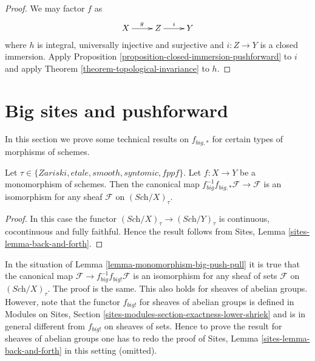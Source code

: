 \begin{proof}
We may factor $f$ as
$$
\xymatrix{
X \ar[r]^g & Z \ar[r]^i & Y
}
$$
where $h$ is integral, universally injective and surjective
and $i : Z \to Y$ is a closed immersion.
Apply
Proposition \ref{proposition-closed-immersion-pushforward}
to $i$ and apply
Theorem \ref{theorem-topological-invariance}
to $h$.
\end{proof}









\section{Big sites and pushforward}
\label{section-big}

\noindent
In this section we prove some technical results on $f_{big, *}$ for
certain types of morphisms of schemes.

\begin{lemma}
\label{lemma-monomorphism-big-push-pull}
Let $\tau \in \{Zariski, etale, smooth, syntomic, fppf\}$.
Let $f : X \to Y$ be a monomorphism of schemes.
Then the canonical map
$f_{big}^{-1}f_{big, *}\mathcal{F} \to \mathcal{F}$
is an isomorphism for any sheaf $\mathcal{F}$ on
$(\textit{Sch}/X)_\tau$.
\end{lemma}

\begin{proof}
In this case the functor $(\textit{Sch}/X)_\tau \to (\textit{Sch}/Y)_\tau$
is continuous, cocontinuous and fully faithful. Hence the result follows from
Sites, Lemma \ref{sites-lemma-back-and-forth}.
\end{proof}

\begin{remark}
\label{remark-push-pull-shriek}
In the situation of
Lemma \ref{lemma-monomorphism-big-push-pull}
it is true that the canonical map
$\mathcal{F} \to f_{big}^{-1}f_{big!}\mathcal{F}$
is an isomorphism for any sheaf of sets $\mathcal{F}$ on
$(\textit{Sch}/X)_\tau$. The proof is the same. This also
holds for sheaves of abelian groups. However, note
that the functor $f_{big!}$ for sheaves of abelian groups is defined in
Modules on Sites, Section \ref{sites-modules-section-exactness-lower-shriek}
and is in general different from $f_{big!}$ on sheaves of sets.
Hence to prove the result for sheaves of abelian groups one has to
redo the proof of
Sites, Lemma \ref{sites-lemma-back-and-forth}
in this setting (omitted).
\end{remark}


